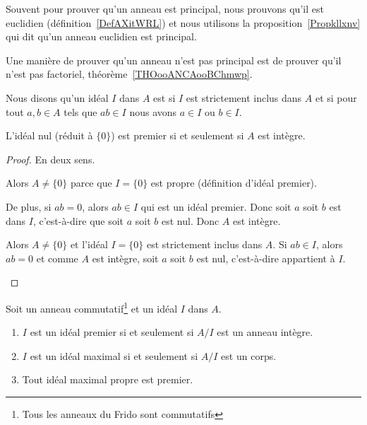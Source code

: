 Souvent pour prouver qu'un anneau est principal, nous prouvons qu'il est euclidien (définition~\ref{DefAXitWRL}) et nous utilisons la proposition~\ref{Propkllxnv} qui dit qu'un anneau euclidien est principal.

Une manière de prouver qu'un anneau n'est pas principal est de prouver qu'il n'est pas factoriel, théorème~\ref{THOooANCAooBChmwp}.

\begin{definition}      \label{DEFooAQSZooVhvQWv}
	Nous disons qu'un idéal \( I\) dans \( A\) est  si \( I\) est strictement inclus dans \( A\) et si pour tout \( a,b\in A\) tels que \( ab\in I\) nous avons \( a\in I\) ou \( b\in I\).
\end{definition}

\begin{lemma}       \label{LEMooYRPBooYxXXsi}
	L'idéal nul (réduit à \( \{ 0 \}\)) est premier si et seulement si \( A\) est intègre.
\end{lemma}

\begin{proof}
	En deux sens.
	\begin{subproof}
		Alors \( A\neq \{ 0 \}\) parce que \( I=\{ 0 \}\) est propre (définition d'idéal premier).

		De plus, si \( ab=0\), alors \( ab\in I\) qui est un idéal premier. Donc soit \( a\) soit \( b\) est dans \( I\), c'est-à-dire que soit \( a\) soit \( b\) est nul. Donc \( A\) est intègre.

		Alors \( A\neq \{ 0 \}\) et l'idéal \( I=\{ 0 \}\) est strictement inclus dans \( A\). Si \( ab\in I\), alors \( ab=0\) et comme \( A\) est intègre, soit \( a\) soit \( b\) est nul, c'est-à-dire appartient à \( I\).
	\end{subproof}
\end{proof}

\begin{proposition}      \label{PROPooRUQKooIfbnQX}
	Soit un anneau commutatif\footnote{Tous les anneaux du Frido sont commutatifs} et un idéal \( I\) dans \( A\).
	\begin{enumerate}
		\item       \label{ITEMooUGBTooOGrnWl}
		      \( I\) est un idéal premier si et seulement si \( A/I\) est un anneau intègre.
		\item   \label{ITEMooGLXSooUjINqR}
		      \( I\) est un idéal maximal si et seulement si \( A/I\) est un corps.
		\item       \label{ITEMooTFFQooOUajFw}
		      Tout idéal maximal propre est premier.
	\end{enumerate}
\end{proposition}

